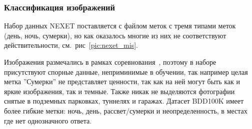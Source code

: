 \documentclass[11pt,a4paper]{extarticle}
\begin{document}
{		\subsubsection*{Классификация изображений}\label{sec:classify_images}

			Набор данных NEXET поставляется с файлом меток  с тремя типами меток (день, ночь, сумерки), но как оказалось многие из них не соответствуют действительности, см.~рис~\ref{pic:nexet_mis}.
			
			\noindent
			Изображения размечались в рамках соревнования~\cite{data:nexet}, поэтому в наборе присутствуют спорные данные, неприминимые в обучении, так например целая метка ''Сумерки'' не представляет ценности, так как на ней могут быть как и яркие изображения, так и темные.
			Также никак не выделяются фотографии снятые в подземных парковках, туннелях и гаражах.
			Датасет BDD100K имеет более гибкие метки: ночь, день, рассвет/сумерки и неопределенность, в местах где нет однозначного ответа.

}
\end{document}

